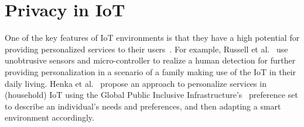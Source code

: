 %
%
% 

\section{Privacy in IoT}
One of the key features of IoT environments is that they have a high potential for providing personalized services to their users~\cite{vallee2016personalization, etzion2014personalization, hemant2015internet}. For example, Russell et al.~\cite{russell2015personalization} use unobtrusive sensors and micro-controller to realize a human detection for further providing personalization in a scenario of a family making use of the IoT in their daily living. Henka et al.~\cite{henka2016personalizing} propose an approach to personalize services in (household) IoT using the Global Public Inclusive Infrastructure's~\cite{vanderheiden2011creating} preference set to describe an individual's needs and preferences, and then adapting a smart environment accordingly.

